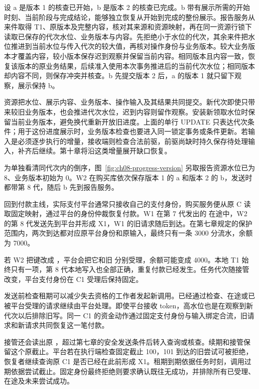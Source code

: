 设 a 是版本 1 的核查已开始，b 是版本 2 的核查已完成。b 带有展示所需的开始时刻、当前阶段与完成结论，能够独立恢复从开始到完成的整份展示。报告服务从来件取得 T1、原版本及完整内容，核对其来源和资源映射，再在同一资源行锁下读取已保存的代次水位、业务版本与内容。先拒绝小于水位的代次，其余来件把水位推进到当前水位与传入代次的较大值，再核对操作身份与业务版本。较大业务版本才覆盖内容，较小版本保存迟到观察并保留当前内容。相同版本且内容一致，恢复该版本的原业务结果，后续准入使用本次事务推进后的当前代次水位；相同版本却内容不同，则保存冲突并核查。b 先提交版本 2 后，a 的版本 1 就只留下观察，展示保持 b。

资源把水位、展示内容、业务版本、操作输入及其结果共同提交。新代次即使只带来较旧业务版本，也会推进代次水位，迟到内容则留作观察。安装新领取水位时保留当前业务版本，避免换代重新开放旧进度。上面的单行 UPDATE 只表达代次条件；用于这份进度展示时，业务版本检查也要进入同一锁定事务或条件更新。若输入是必须逐步执行的增量，接收端则检查合法前驱，前驱尚缺时持久保存待处理输入，补齐后继续。第十章将沿这类增量展开缺口恢复。

为单独看清同代次内的倒序，图~\ref{fig:ch08-progress-version} 另取报告资源水位已为 8、业务版本初始为 0。W2 在购买库依次保存版本 1 的 a 和版本 2 的 b，发送时都带第 8 代，随后 b 先到报告服务。


回到付款主线，实际支付平台通常只接收自己的支付身份，购买服务便从原 C 读取固定映射，通过平台的身份仲裁恢复付款。W1 在第 7 代发出的  在途中，W2 的第 8 代发送先到平台并形成 X1，W1 的旧请求随后到达。在第七章规定的保护范围内，两次到达都对应原平台身份和原输入，最终只有一条 3000 分流水，余额为 7000。

若 W2 把键改成 ，平台会把它和旧  分别受理，余额可能变成 4000。本地 T1 始终只有一项，第 8 代本地写入也全部正确，重复付款已经发生。任务代次随接管改变，平台支付身份在 C1 受理后保持固定。

发送前检查租期可以减少失去资格的工作者发起新调用。已经通过检查、在途或已被平台受理的请求继续由平台处理。即使平台接收 token，高水位也是在观察到新代次以后排除旧写。同一 C1 的资金动作通过固定支付身份与输入绑定合流，旧请求和新请求共同恢复这一笔付款。

接管还会读出原 ，超过第七章的安全发送条件后转入查询或核查。续期和接管保留这个原截止。平台若在执行端检查固定截止 100，101 到达的旧尝试可被拒绝，恢复者继续查询原 C1 是否已经在此前形成 X1。租期到期依据任务时刻，调用过期依据尝试截止。固定身份最终拒绝则要求确认既往无成功，并排除所有已受理、在途及未来尝试成功。
